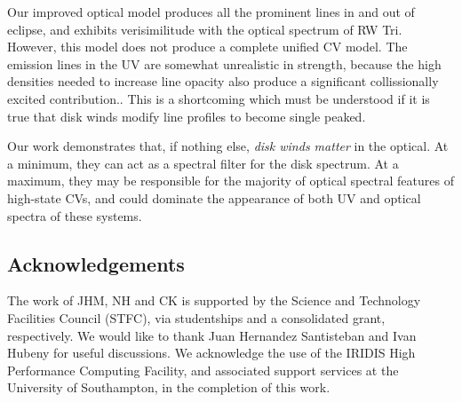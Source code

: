 \documentclass[preprint, a4paper, 11pt]{aastex}
\begin{document}
\smallskip
Our improved optical model produces all the prominent lines in and out of eclipse, and
exhibits verisimilitude with the optical spectrum of RW Tri.
However, this model does not produce a complete unified CV model. 
The emission lines in the UV are somewhat unrealistic in strength,
because the high densities needed to increase line opacity also produce
a significant collissionally excited contribution..
This is a shortcoming which must be understood if it is true that
disk winds modify line profiles to become single peaked.

Our work demonstrates that, if nothing else,
{\sl disk winds matter} in the optical. At a minimum,
they can act as a spectral filter
for the disk spectrum.
At a maximum, they may be responsible
for the majority of optical spectral features of high-state CVs,
and could dominate the appearance of both UV and optical
spectra of these systems.











\subsection*{Acknowledgements}
The work of JHM, NH and CK is supported by the Science and Technology Facilities Council (STFC), 
via studentships and a consolidated grant, respectively. We would like to thank Juan Hernandez Santisteban and Ivan Hubeny 
for useful discussions. We acknowledge the use of the IRIDIS High Performance Computing Facility, 
and associated support services at the University of Southampton, in the completion of this work.


\newpage
\newpage

\end{document}

